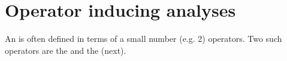 

\section{Operator inducing analyses}
An  is often defined in terms of a small number (e.g. 2) operators.
Two such operators are the  and the  (next).

